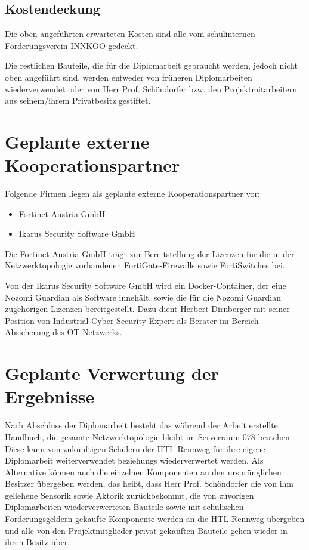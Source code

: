 \documentclass[
	headings=optiontotocandhead,%
	oneside,
	numbers=noenddot,%
	toc=flat, %
	10pt, %
	parskip=full, %
	listof=totoc, %
	listof=flat, %
	numbers=noenddot, %
	bibliography=totoc, %
	a4paper,DIV=14,
]{scrartcl}
\begin{document}
\subsection{Kostendeckung}
Die oben angeführten erwarteten Kosten sind alle vom schulinternen Förderungsverein INNKOO gedeckt.

Die restlichen Bauteile, die für die Diplomarbeit gebraucht werden, jedoch nicht oben angeführt sind, werden entweder von früheren Diplomarbeiten wiederverwendet oder von Herr Prof. Schöndorfer bzw. den Projektmitarbeitern aus seinem/ihrem Privatbesitz gestiftet.

\newpage
\section{Geplante externe Kooperationspartner}
Folgende Firmen liegen als geplante externe Kooperationspartner vor:
\begin{itemize}
	\item{Fortinet Austria GmbH}
	\item{Ikarus Security Software GmbH}
\end{itemize}
Die Fortinet Austria GmbH trägt zur Bereitstellung der Lizenzen für die in der Netzwerktopologie vorhandenen FortiGate-Firewalls sowie FortiSwitches bei.

Von der Ikarus Security Software GmbH wird ein Docker-Container, der eine Nozomi Guardian als Software innehält, sowie die für die Nozomi Guardian zugehörigen Lizenzen bereitgestellt. Dazu dient Herbert Dirnberger mit seiner Position von Industrial Cyber Security Expert als Berater im Bereich Absicherung des OT-Netzwerks.

\newpage
\section{Geplante Verwertung der Ergebnisse}
Nach Abschluss der Diplomarbeit besteht das während der Arbeit erstellte Handbuch, die gesamte Netzwerktopologie bleibt im Serverraum 078 bestehen. Diese kann von zukünftigen Schülern der HTL Rennweg für ihre eigene Diplomarbeit weiterverwendet beziehungs wiederverwertet werden. Als Alternative können auch die einzelnen Komponenten an den ursprünglichen Besitzer übergeben werden, das heißt, dass Herr Prof. Schöndorfer die von ihm geliehene Sensorik sowie Aktorik zurückbekommt, die von zuvorigen Diplomarbeiten wiederverwerteten Bauteile sowie mit schulischen Förderungsgeldern gekaufte Komponente werden an die HTL Rennweg übergeben und alle von den Projektmitglieder privat gekauften Bauteile gehen wieder in ihren Besitz über.
\end{document}

